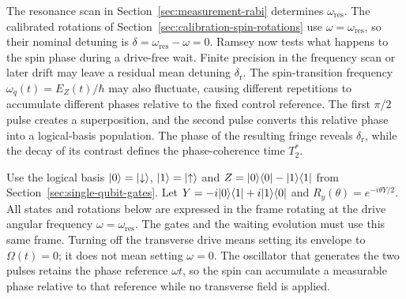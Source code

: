 The resonance scan in Section~\ref{sec:measurement-rabi} determines
$\omega_{\mathrm{res}}$. The calibrated rotations of
Section~\ref{sec:calibration-spin-rotations} use
$\omega=\omega_{\mathrm{res}}$, so their nominal detuning is
$\delta=\omega_{\mathrm{res}}-\omega=0$. Ramsey now tests what
happens to the spin phase during a drive-free wait. Finite precision
in the frequency scan or later drift may leave a residual mean
detuning $\delta_{\mathrm r}$. The spin-transition frequency
$\omega_q(t)=E_Z(t)/\hbar$ may also fluctuate, causing different
repetitions to accumulate different phases relative to the fixed
control reference. The first $\pi/2$ pulse creates a superposition,
and the second pulse converts this relative phase into a logical-basis
population. The phase of the resulting fringe reveals
$\delta_{\mathrm r}$, while the decay of its contrast defines the
phase-coherence time $T_2^*$.

Use the logical basis $\lvert 0\rangle=\lvert \downarrow\rangle$,
$\lvert 1\rangle=\lvert \uparrow\rangle$ and $Z=\lvert 0\rangle\langle 0\rvert-\lvert 1\rangle\langle 1\rvert$ from
Section~\ref{sec:single-qubit-gates}. Let
$Y=-i\lvert 0\rangle\langle 1\rvert+i\lvert 1\rangle\langle 0\rvert$ and
$R_y(\theta)=e^{-i\theta Y/2}$. All states and rotations below
are expressed in the frame rotating at the drive angular frequency
$\omega=\omega_{\mathrm{res}}$. The gates and the waiting evolution
must use this same frame. Turning off the transverse drive means
setting its envelope to $\Omega(t)=0$; it does not mean setting
$\omega=0$. The oscillator that generates the two pulses retains
the phase reference $\omega t$, so the spin can accumulate a
measurable phase relative to that reference while no transverse
field is applied.

